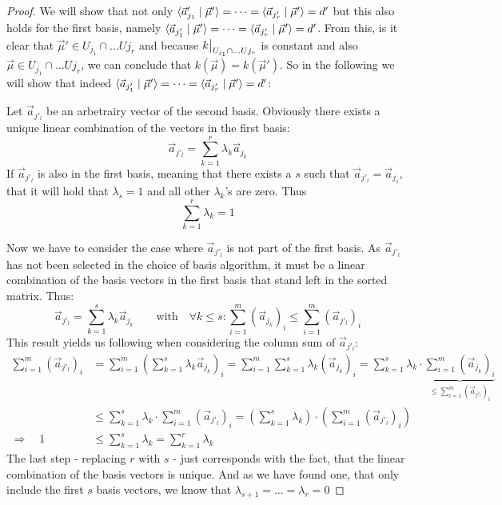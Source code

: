 \begin{proof}
    We will show that not only $\langle \vec a'_{j_1} \mid \vec\mu' \rangle = \dots = \langle \vec a_{j'_r} \mid \vec\mu' \rangle = d'$ but this also holds for the first basis, namely $\langle \vec a_{j'_1} \mid \vec\mu' \rangle = \dots = \langle \vec a_{j'_r} \mid \vec\mu' \rangle = d'$. From this, is it clear that $\vec\mu' \in U_{j_1} \cap \dots U{j_r}$ and because $\restrict{k}{U_{j_1} \cap \dots U{j_r}}$ is constant and also $\vec\mu \in U_{j_1} \cap \dots U{j_r}$, we can conclude that $k(\vec\mu) = k(\vec\mu')$. So in the following we will show that indeed $\langle \vec a_{j'_1} \mid \vec\mu' \rangle = \dots = \langle \vec a_{j'_r} \mid \vec\mu' \rangle = d'$:

    Let $\vec a_{j'_l}$ be an arbetrairy vector of the second basis. Obviously there exists a unique linear combination of the vectors in the first basis:
    $$\vec a_{j'_l} = \sum_{k=1}^{r}\lambda_k\vec a_{j_k}$$
    If $\vec a_{j'_l}$ is also in the first basis, meaning that there exists a $s$ such that $\vec a_{j'_l} = \vec a_{j_s}$, that it will hold that $\lambda_s = 1$ and all other $\lambda_k$'s are zero. Thus
    $$\sum_{k=1}^{r}\lambda_k = 1$$

    Now we have to consider the case where $\vec a_{j'_l}$ is not part of the first basis. As $\vec a_{j'_l}$ has not been selected in the choice of basis algorithm, it must be a linear combination of the basis vectors in the first basis that stand left in the sorted matrix. Thus:
    $$\vec a_{j'_l} = \sum_{k=1}^{s}\lambda_k\vec a_{j_k} \qquad\textrm{with}\quad \forall k \leq s\colon\sum_{i=1}^{m}(\vec a_{j_k})_i \leq \sum_{i=1}^{m}(\vec a_{j'_l})_i$$
    This result yields us following when considering the column sum of $\vec a_{j'_l}$:
    \begin{align*}
        \sum_{i=1}^{m} (\vec a_{j'_l})_i &= \sum_{i=1}^{m} \left(\sum_{k=1}^{s}\lambda_k \vec a_{j_k}\right)_i = \sum_{i=1}^{m} \sum_{k=1}^{s}\lambda_k \left(\vec a_{j_k}\right)_i = \sum_{k=1}^{s} \lambda_k \cdot\underbrace{\sum_{i=1}^{m} \left(\vec a_{j_k}\right)_i}_{\leq \sum_{i=1}^{m} (\vec a_{j'_l})_i}\\
        &\leq \sum_{k=1}^{s} \lambda_k \cdot\sum_{i=1}^{m} (\vec a_{j'_l})_i = \left(\sum_{k=1}^{s} \lambda_k\right) \cdot\left(\sum_{i=1}^{m} (\vec a_{j'_l})_i\right)\\
        \Rightarrow\quad 1 &\leq \sum_{k=1}^{s} \lambda_k = \sum_{k=1}^{r} \lambda_k
    \end{align*}
    The last step - replacing $r$ with $s$ - just corresponds with the fact, that the linear combination of the basis vectors is unique. And as we have found one, that only include the first $s$ basis vectors, we know that $\lambda_{s+1} = \dots = \lambda_r = 0$


\end{proof}
